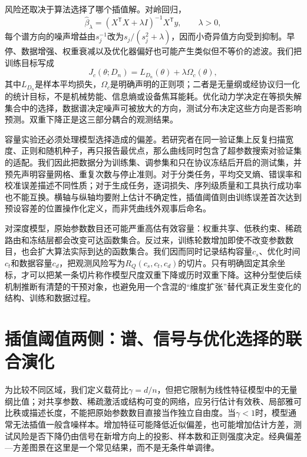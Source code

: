 风险还取决于算法选择了哪个插值解。对岭回归，
\begin{equation}
  \widehat\beta_{\lambda}
  =(X^{\mathsf T}X+\lambda I)^{-1}X^{\mathsf T}y,
  \qquad \lambda>0,
\end{equation}
每个谱方向的噪声增益由$s_j^{-1}$改为$s_j/(s_j^2+\lambda)$，因而小奇异值方向受到抑制。早停、数据增强、权重衰减以及优化器偏好也可能产生类似但不等价的滤波。我们把训练目标写成
\begin{equation}
  J_c(\theta;D_n)=L_{D_n}(\theta)+\lambda\Omega_c(\theta),
\end{equation}
其中$L_{D_n}$是样本平均损失，$\Omega_c$是明确声明的正则项；二者是无量纲或经协议归一化的统计目标，不是机械势能、信息熵或设备焦耳能耗。优化动力学决定在等损失解集合中的选择，数据谱决定噪声可被放大的方向，测试分布决定这些方向是否影响预测。双重下降正是这三部分耦合的观测结果。

容量实验还必须处理模型选择造成的偏差。若研究者在同一验证集上反复扫描宽度、正则和随机种子，再只报告最优点，那么曲线同时包含了超参数搜索对验证集的适配。我们因此把数据分为训练集、调参集和只在协议冻结后开启的测试集，并预先声明容量网格、重复次数与停止准则。对于分类任务，平均交叉熵、错误率和校准误差描述不同性质；对于生成任务，逐词损失、序列级质量和工具执行成功率也不能互换。横轴与纵轴均要附上估计不确定性，插值阈值则由训练误差首次达到预设容差的位置操作化定义，而非凭曲线外观事后命名。

对深度模型，原始参数数目还可能严重高估有效容量：权重共享、低秩约束、稀疏路由和冻结层都会改变可达函数集合。反过来，训练轮数增加即使不改变参数数目，也会扩大算法实际到达的函数集合。我们因而同时记录结构容量$c_s$、优化时间$c_t$和数据容量$c_d$，把观测风险写为$R_Q(c_s,c_t,c_d)$的切片。只有明确固定其余坐标，才可以把某一条切片称作模型尺度双重下降或历时双重下降。这种分型使后续机制推断有清楚的干预对象，也避免用一个含混的“维度扩张”替代真正发生变化的结构、训练和数据过程。

\section{插值阈值两侧：谱、信号与优化选择的联合演化}
\label{sec:section_12462}

为比较不同区域，我们定义载荷比$\gamma=d/n$，但把它限制为线性特征模型中的无量纲比值；对共享参数、稀疏激活或结构可变的网络，应另行估计有效秩、局部雅可比秩或描述长度，不能把原始参数数目直接当作独立自由度。当$\gamma<1$时，模型通常无法插值一般含噪样本。增加特征可能降低近似偏差，也可能增加估计方差，测试风险是否下降仍由信号在新增方向上的投影、样本数和正则强度决定。经典偏差—方差图景在这里是一个常见结果，而不是无条件单调律。

